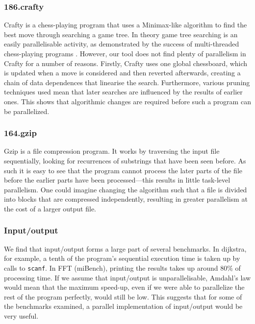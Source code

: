 \subsubsection{186.crafty}

Crafty is a chess-playing program that uses a Minimax-like algorithm to find the best move through searching a game tree.
In theory game tree searching is an easily parallelisable activity, as demonstrated by the success of multi-threaded chess-playing programs \cite{Dailey01usingcilk}.
However, our tool does not find plenty of parallelism in Crafty for a number of reasons.
Firstly, Crafty uses one global chessboard, which is updated when a move is considered and then reverted afterwards, creating a chain of data dependences that linearise the search.
Furthermore, various pruning techniques used mean that later searches are influenced by the results of earlier ones.
This shows that algorithmic changes are required before such a program can be parallelized.

\subsubsection{164.gzip}

Gzip is a file compression program.
It works by traversing the input file sequentially, looking for recurrences of substrings that have been seen before.
As such it is easy to see that the program cannot process the later parts of the file before the earlier parts have been processed---this results in little task-level parallelism.
One could imagine changing the algorithm such that a file is divided into blocks that are compressed independently, resulting in greater parallelism at the cost of a larger output file.

\subsubsection{Input/output}

We find that input/output forms a large part of several benchmarks.
In dijkstra, for example, a tenth of the program's sequential execution time is taken up by calls to \texttt{scanf}.
In FFT (miBench), printing the results takes up around 80\% of processing time.
If we assume that input/output is unparallelisable, Amdahl's law would mean that the maximum speed-up, even if we were able to parallelize the rest of the program perfectly, would still be low.
This suggests that for some of the benchmarks examined, a parallel implementation of input/output would be very useful.

